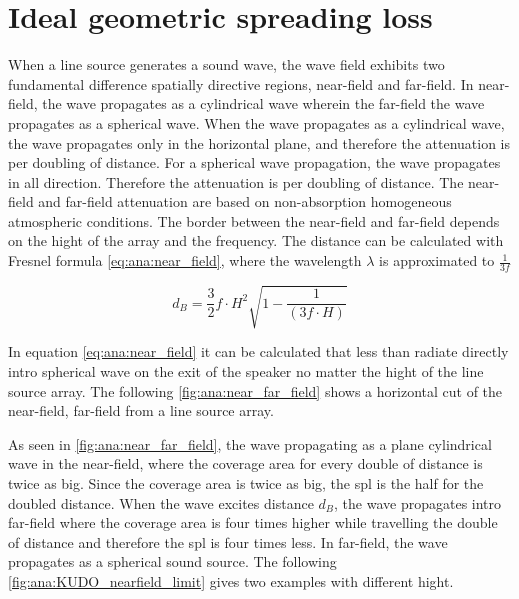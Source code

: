 \section{Ideal geometric spreading loss}\label{sec:ana:geo_spr_los}
When a line source generates a sound wave, the wave field exhibits two fundamental difference spatially directive regions, near-field and far-field. In near-field, the wave propagates as a cylindrical wave wherein the far-field the wave propagates as a spherical wave. When the wave propagates as a cylindrical wave, the wave propagates only in the horizontal plane, and therefore the attenuation is  per doubling of distance. For a spherical wave propagation, the wave propagates in all direction. Therefore the attenuation is  per doubling of distance. The near-field and far-field attenuation are based on non-absorption homogeneous atmospheric conditions. The border between the near-field and far-field depends on the hight of the array and the frequency. The distance can be calculated with Fresnel formula \autoref{eq:ana:near_field}, where the wavelength $\lambda$ is approximated to $\frac{1}{3f}$ \citep{bauman2001wavefront}

\begin{equation}\label{eq:ana:near_field}
d_{B} = \frac{3}{2}f \cdot H^{2}\sqrt{1-\frac{1}{(3f \cdot H)}}
\end{equation}

\startexplain
{}
\stopexplain

In equation \autoref{eq:ana:near_field} it can be calculated that less than  radiate directly intro spherical wave on the exit of the speaker no matter the hight of the line source array. The following \autoref{fig:ana:near_far_field} shows a horizontal cut of the near-field, far-field from a line source array. 


As seen in \autoref{fig:ana:near_far_field}, the wave propagating as a plane cylindrical wave in the near-field, where the coverage area for every double of distance is twice as big. Since the coverage area is twice as big, the \gls{spl} is the half for the doubled distance. When the wave excites distance $d_B$, the wave propagates intro far-field where the coverage area is four times higher while travelling the double of distance and therefore the \gls{spl} is four times less. In far-field, the wave propagates as a spherical sound source. The following \autoref{fig:ana:KUDO_nearfield_limit} gives two examples with different hight.

